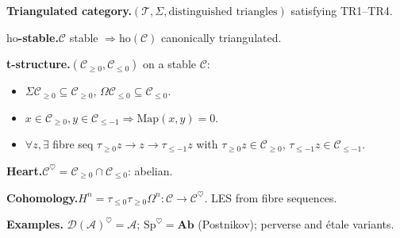 \begin{formalrestatement}
\textbf{Triangulated category.}\quad $(\mathcal{T}, \Sigma, \text{distinguished triangles})$
satisfying TR1--TR4.

\medskip
\textbf{$\mathrm{ho}$-stable.}\quad $\mathcal{C}$ stable $\Rightarrow
\mathrm{ho}(\mathcal{C})$ canonically triangulated.

\medskip
\textbf{t-structure.}\quad $(\mathcal{C}_{\geq 0}, \mathcal{C}_{\leq 0})$ on a stable
$\mathcal{C}$:
\begin{itemize}
  \item $\Sigma \mathcal{C}_{\geq 0} \subseteq \mathcal{C}_{\geq 0}$, $\Omega \mathcal{C}_{\leq 0} \subseteq \mathcal{C}_{\leq 0}$.
  \item $x \in \mathcal{C}_{\geq 0}, y \in \mathcal{C}_{\leq -1} \Rightarrow \mathrm{Map}(x, y) = 0$.
  \item $\forall z, \exists$ fibre seq $\tau_{\geq 0} z \to z \to \tau_{\leq -1} z$ with $\tau_{\geq 0} z \in \mathcal{C}_{\geq 0}$, $\tau_{\leq -1} z \in \mathcal{C}_{\leq -1}$.
\end{itemize}

\medskip
\textbf{Heart.}\quad $\mathcal{C}^\heartsuit = \mathcal{C}_{\geq 0} \cap \mathcal{C}_{\leq 0}$:
abelian.

\medskip
\textbf{Cohomology.}\quad $H^n = \tau_{\leq 0} \tau_{\geq 0} \Omega^n :
\mathcal{C} \to \mathcal{C}^\heartsuit$. LES from fibre sequences.

\medskip
\textbf{Examples.}\quad
$\mathcal{D}(\mathcal{A})^\heartsuit = \mathcal{A}$;
$\mathrm{Sp}^\heartsuit = \mathbf{Ab}$ (Postnikov);
perverse and étale variants.
\end{formalrestatement}
